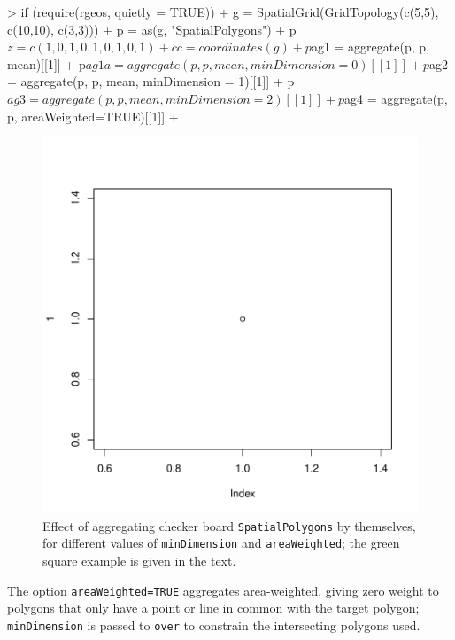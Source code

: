 \documentclass{article}
\newcommand{\code}[1]{{\tt #1}}
\begin{document}
\begin{Schunk}
\begin{Sinput}
> if (require(rgeos, quietly = TRUE)) {
+ g = SpatialGrid(GridTopology(c(5,5), c(10,10), c(3,3)))
+ p = as(g, "SpatialPolygons")
+ p$z = c(1,0,1,0,1,0,1,0,1)
+ cc = coordinates(g)
+ p$ag1 = aggregate(p, p, mean)[[1]]
+ p$ag1a = aggregate(p, p, mean, minDimension = 0)[[1]]
+ p$ag2 = aggregate(p, p, mean, minDimension = 1)[[1]]
+ p$ag3 = aggregate(p, p, mean, minDimension = 2)[[1]]
+ p$ag4 = aggregate(p, p, areaWeighted=TRUE)[[1]]
+ }
\end{Sinput}
\end{Schunk}

\begin{figure}[ht]
\includegraphics{over-032}
\caption{Effect of aggregating checker board {\tt SpatialPolygons} by themselves, for
different values of {\tt minDimension} and {\tt areaWeighted}; the green square example
is given in the text.}
\label{fig:agg}
\end{figure}

The option \code{areaWeighted=TRUE} aggregates area-weighted,
giving zero weight to polygons that only have a point or line in
common with the target polygon; \code{minDimension} is passed to
\code{over} to constrain the intersecting polygons used.
\end{document}
